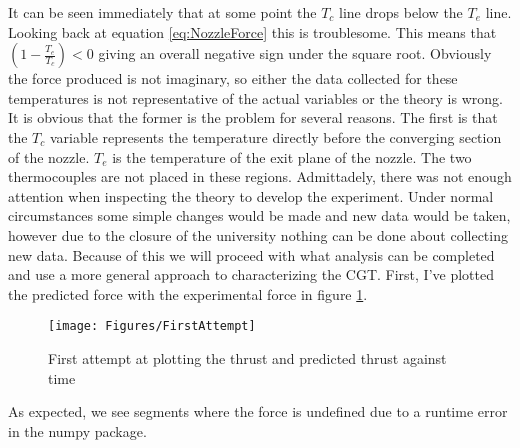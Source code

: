 It can be seen immediately that at some point the $T_c$ line drops below the $T_e$ line. Looking back at equation \ref{eq:NozzleForce} this is troublesome. This means that $\left(1-\frac{T_e}{T_c}\right)<0$ giving an overall negative sign under the square root. Obviously the force produced is not imaginary, so either the data collected for these temperatures is not representative of the actual variables or the theory is wrong. It is obvious that the former is the problem for several reasons. The first is that the $T_c$ variable represents the temperature directly before the converging section of the nozzle. $T_e$ is the temperature of the exit plane of the nozzle. The two thermocouples are not placed in these regions. Admittadely, there was not enough attention when inspecting the theory to develop the experiment. Under normal circumstances some simple changes would be made and new data would be taken, however due to the closure of the university nothing can be done about collecting new data. Because of this we will proceed with what analysis can be completed and use a more general approach to characterizing the CGT. First, I've plotted the predicted force with the experimental force in figure \ref{fig:FirstThrust}. 
\begin{figure}[h!]
\centering
\texttt{[image: Figures/FirstAttempt]}
\caption{First attempt at plotting the thrust and predicted thrust against time}
\label{fig:FirstThrust}
\end{figure}
As expected, we see segments where the force is undefined due to a runtime error in the numpy package.
